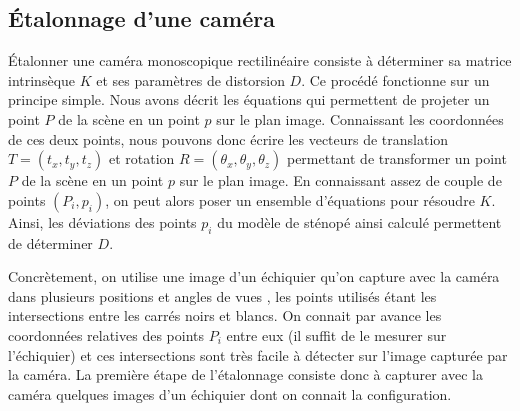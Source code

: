 \subsection{Étalonnage d'une caméra}
\label{subsec:pinhole_camera_calibration}
Étalonner une caméra monoscopique rectilinéaire consiste à déterminer sa matrice intrinsèque $K$ et ses paramètres de distorsion $D$. Ce procédé fonctionne sur un principe simple. Nous avons décrit les équations qui permettent de projeter un point $P$ de la scène en un point $p$ sur le plan image. Connaissant les coordonnées de ces deux points, nous pouvons donc écrire les vecteurs de translation $T = (t_x, t_y, t_z)$ et rotation $R = (\theta_x, \theta_y, \theta_z)$ permettant de transformer un point $P$ de la scène en un point $p$ sur le plan image. En connaissant assez de couple de points $(P_i, p_i)$, on peut alors poser un ensemble d'équations pour résoudre $K$. Ainsi, les déviations des points $p_i$ du modèle de sténopé ainsi calculé permettent de déterminer $D$.


Concrètement, on utilise une image d'un échiquier qu'on capture avec la caméra dans plusieurs positions et angles de vues , les points utilisés étant les intersections entre les carrés noirs et blancs. On connait par avance les coordonnées relatives des points $P_i$ entre eux (il suffit de le mesurer sur l'échiquier) et ces intersections sont très facile à détecter sur l'image capturée par la caméra. La première étape de l'étalonnage consiste donc à capturer avec la caméra quelques images d'un échiquier dont on connait la configuration.


